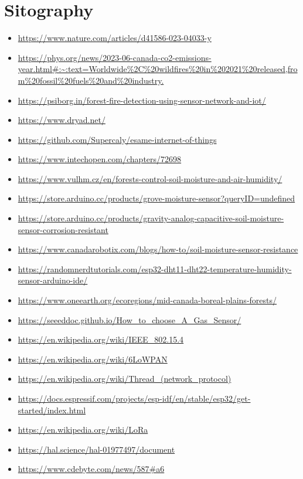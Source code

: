 \documentclass[11pt]{article}
\begin{document}
\section{Sitography}
\begin{itemize}
    \item \url{https://www.nature.com/articles/d41586-023-04033-y}
    \item \url{https://phys.org/news/2023-06-canada-co2-emissions-year.html#:~:text=Worldwide%2C%20wildfires%20in%202021%20released,from%20fossil%20fuels%20and%20industry.}
    \item \url{https://psiborg.in/forest-fire-detection-using-sensor-network-and-iot/}
    \item \url{https://www.dryad.net/}
    \item \url{https://github.com/Supercaly/esame-internet-of-things}
    \item \url{https://www.intechopen.com/chapters/72698}
    \item \url{https://www.vulhm.cz/en/forests-control-soil-moisture-and-air-humidity/}
    \item \url{https://store.arduino.cc/products/grove-moisture-sensor?queryID=undefined}
    \item \url{https://store.arduino.cc/products/gravity-analog-capacitive-soil-moisture-sensor-corrosion-resistant}
    \item \url{https://www.canadarobotix.com/blogs/how-to/soil-moisture-sensor-resistance}
    \item \url{https://randomnerdtutorials.com/esp32-dht11-dht22-temperature-humidity-sensor-arduino-ide/}
    \item \url{https://www.oneearth.org/ecoregions/mid-canada-boreal-plains-forests/}
    \item \url{https://seeeddoc.github.io/How_to_choose_A_Gas_Sensor/}
    \item \url{https://en.wikipedia.org/wiki/IEEE_802.15.4}
    \item \url{https://en.wikipedia.org/wiki/6LoWPAN}
    \item \url{https://en.wikipedia.org/wiki/Thread_(network_protocol)}
    \item \url{https://docs.espressif.com/projects/esp-idf/en/stable/esp32/get-started/index.html}
    \item \url{https://en.wikipedia.org/wiki/LoRa}
    \item \url{https://hal.science/hal-01977497/document}
    \item \url{https://www.cdebyte.com/news/587#a6}

\end{itemize}
\end{document}
